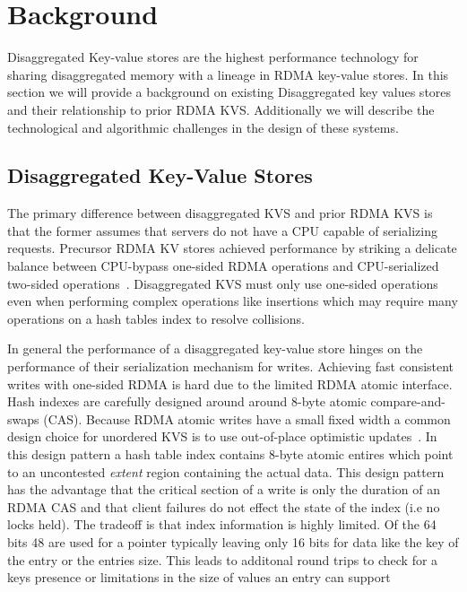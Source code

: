 
\section{Background}
\label{sec:background}

Disaggregated Key-value stores are the highest performance technology for sharing disaggregated
memory with a lineage in RDMA key-value stores. In this section we will provide a background on
existing Disaggregated key values stores and their relationship to prior RDMA KVS. Additionally we
will describe the technological and algorithmic challenges in the design of these systems.



\subsection{Disaggregated Key-Value Stores}

The primary difference between disaggregated KVS and prior RDMA KVS is that the former assumes that
servers do not have a CPU capable of serializing requests. Precursor RDMA KV stores achieved
performance by striking a delicate balance between CPU-bypass one-sided RDMA operations and
CPU-serialized two-sided operations~\cite{farm,herd,pilaf,cell,storm}. Disaggregated KVS must only
use one-sided operations even when performing complex operations like insertions which may require
many operations on a hash tables index to resolve collisions.

In general the performance of a disaggregated key-value store hinges on the performance of their
serialization mechanism for writes. Achieving fast consistent writes with one-sided RDMA is hard due
to the limited RDMA atomic interface. Hash indexes are carefully designed around around 8-byte
atomic compare-and-swaps (CAS). Because RDMA atomic writes have a small fixed width a common design
choice for unordered KVS is to use out-of-place optimistic updates~\cite{race,fusee,ditto}. In this
design pattern a hash table index contains 8-byte atomic entires which point to an uncontested
\textit{extent} region containing the actual data. This design pattern has the advantage that the
critical section of a write is only the duration of an RDMA CAS and that client failures do not
effect the state of the index (i.e no locks held). The tradeoff is that index information is highly
limited. Of the 64 bits 48 are used for a pointer typically leaving only 16 bits for data like the
key of the entry or the entries size. This leads to additonal round trips to check for a keys
presence or limitations in the size of values an entry can support~\cite{race,fusee}


